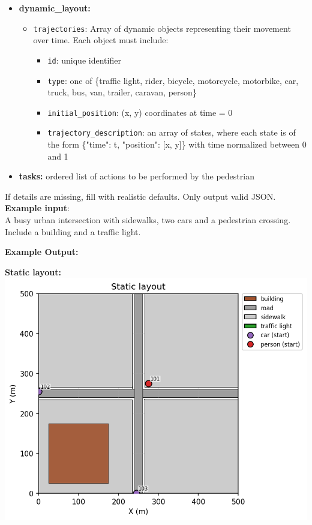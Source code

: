 \documentclass{article}
\begin{document}
\begin{tcolorbox}[examplebox, title=Scene Specification Format]
\begin{itemize}
   \item \textbf{dynamic\_layout:} 
    \begin{itemize}
      \item \texttt{trajectories}: Array of dynamic objects representing their movement over time.  
        Each object must include:  
        \begin{itemize}
        \item \texttt{id}: unique identifier  
        \item \texttt{type}: one of \{traffic light, rider, bicycle, motorcycle, motorbike, car, truck, bus, van, trailer, caravan, person\}  
        \item \texttt{initial\_position}: (x, y) coordinates at time = 0  
        \item \texttt{trajectory\_description}: an array of states, where each state is of the form  
          \{"time": t, "position": [x, y]\} with time normalized between 0 and 1  
        \end{itemize}
    \end{itemize}

  \item \textbf{tasks:} ordered list of actions to be performed by the pedestrian
\end{itemize}

If details are missing, fill with realistic defaults. Only output valid JSON.\\

\textbf{Example input}: \\

A busy urban intersection with sidewalks, two cars and a pedestrian crossing. Include a building and a traffic light.

\noindent\textbf{Example Output:}

\textbf{Static layout:}
\includegraphics[width=0.8\linewidth]{images/gemini_static_example.png}


\end{tcolorbox}
\end{document}
